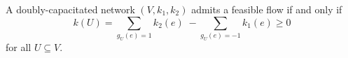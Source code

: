 A doubly-capacitated network $(V, k_1, k_2)$ admits a feasible flow if and only if
$$k(U) = \sum_{g_U(e)=1} k_2(e) \; - \!\! \sum_{g_U(e)=-1} k_1(e) \geq 0$$
for all $U \subseteq V$.
